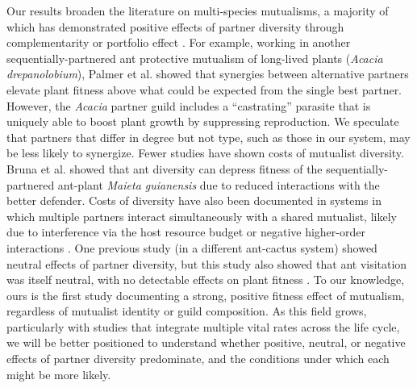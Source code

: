 \documentclass[11pt]{article}
\begin{document}
Our results broaden the literature on multi-species mutualisms, a majority of which has demonstrated positive effects of partner diversity through complementarity \citep{Yang2024,Hernandez2020,Larimer2014,Afkhami2016,Fehling2022,Gustafson2005,McKeon2012,Palmer2010,Afkhami2021,Stachowicz2005} or portfolio effect \citep{Stevens2024,Thibaut2012,rogers2014,Lazaro2022}. 
For example, working in another sequentially-partnered ant protective mutualism of long-lived plants (\textit{Acacia drepanolobium}), Palmer et al. \citeyear{Palmer2010} showed that synergies between alternative partners elevate plant fitness above what could be expected from the single best partner. 
However, the \textit{Acacia} partner guild includes a ``castrating'' parasite that is uniquely able to boost plant growth by suppressing reproduction. 
We speculate that partners that differ in degree but not type, such as those in our system, may be less likely to synergize. 
Fewer studies have shown costs of mutualist diversity. 
Bruna et al. \citeyear{Bruna2014} showed that ant diversity can depress fitness of the sequentially-partnered ant-plant \textit{Maieta guianensis} due to reduced interactions with the better defender. 
Costs of diversity have also been documented in systems in which multiple partners interact simultaneously with a shared mutualist, likely due to interference via the host resource budget \citep{Keller2018} or negative higher-order interactions \citep{Barrett2015}. 
One previous study (in a different ant-cactus system) showed neutral effects of partner diversity, but this study also showed that ant visitation was itself neutral, with no detectable effects on plant fitness \citep{Ford2015}. 
To our knowledge, ours is the first study documenting a strong, positive fitness effect of mutualism, regardless of mutualist identity or guild composition. 
As this field grows, particularly with studies that integrate multiple vital rates across the life cycle, we will be better positioned to understand whether positive, neutral, or negative effects of partner diversity predominate, and the conditions under which each might be more likely. 
\end{document}
